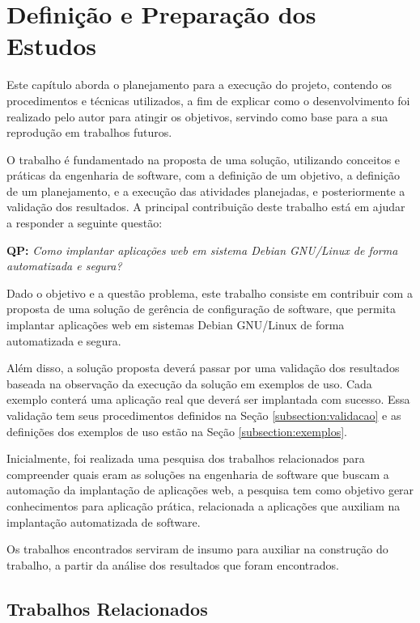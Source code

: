 \chapter{Definição e Preparação dos Estudos}

\label{cap-metodologia}
Este capítulo aborda o planejamento para a execução do projeto,
contendo os procedimentos e técnicas utilizados, a fim de
explicar como o desenvolvimento foi realizado pelo autor para atingir os objetivos,
servindo como base para a sua reprodução em trabalhos futuros.

O trabalho é fundamentado na proposta de uma solução, utilizando conceitos e práticas
da engenharia de software, com a definição de um objetivo, a definição de um planejamento,
e a execução das atividades planejadas, e posteriormente a validação dos resultados. 
A principal contribuição deste trabalho está em ajudar a responder a seguinte questão:

\begin{center}
 \textbf{QP:}
  \textit{
  Como implantar aplicações web em sistema Debian GNU/Linux de forma automatizada e
  segura?
}
\end{center}

Dado o objetivo e a questão problema, este trabalho consiste em contribuir
com a proposta de uma solução de gerência de configuração de software, que permita implantar
aplicações web em sistemas Debian GNU/Linux de forma automatizada e segura.

Além disso, a solução proposta deverá passar
por uma validação dos resultados baseada na observação
da execução da solução em exemplos de uso. Cada exemplo conterá uma aplicação
real que deverá ser implantada com sucesso. Essa validação tem seus procedimentos
definidos na Seção \ref{subsection:validacao} e as definições dos exemplos de uso
estão na Seção \ref{subsection:exemplos}.

Inicialmente, foi realizada uma pesquisa dos trabalhos relacionados para compreender
quais eram as soluções na engenharia de software que buscam a automação da implantação
de aplicações web, a pesquisa tem como objetivo
gerar conhecimentos para aplicação prática,
relacionada a aplicações que auxiliam na implantação automatizada de software.

Os trabalhos encontrados serviram de insumo para auxiliar na construção do trabalho, 
a partir da análise dos resultados que foram encontrados. 

\section{Trabalhos Relacionados}
\label{section:trabalhos_relacionados}

